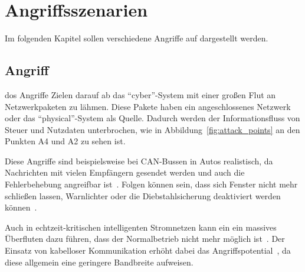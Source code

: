 
\section{Angriffsszenarien}\label{sec:angriffszenarien}
Im folgenden Kapitel sollen verschiedene Angriffe auf \cps dargestellt werden.


\subsection{ Angriff}\label{subsec:dos}
\gls{dos} Angriffe Zielen darauf ab das \enquote{cyber}-System mit einer großen Flut an Netzwerkpaketen zu lähmen.
Diese Pakete haben ein angeschlossenes Netzwerk oder das \enquote{physical}-System als Quelle.
Dadurch werden der Informationsfluss von Steuer und Nutzdaten unterbrochen, wie in Abbildung~\ref{fig:attack_points} an den Punkten A4 und A2 zu sehen ist.

Diese Angriffe sind beispielsweise bei CAN-Bussen in Autos realistisch, da Nachrichten mit vielen Empfängern gesendet werden und auch die Fehlerbehebung angreifbar ist~\cite{HUM 81,26}.%
Folgen können sein, dass sich Fenster nicht mehr schließen lassen, Warnlichter oder die Diebstahlsicherung deaktiviert werden können~\cite{HUM 68}.

Auch in echtzeit-kritischen intelligenten Stromnetzen kann ein ein massives Überfluten dazu führen, dass der Normalbetrieb nicht mehr möglich ist~\cite{HUM 98}.
Der Einsatz von kabelloser Kommunikation erhöht dabei das Angriffspotential~\cite{HUM 99}, da diese allgemein eine geringere Bandbreite aufweisen.
